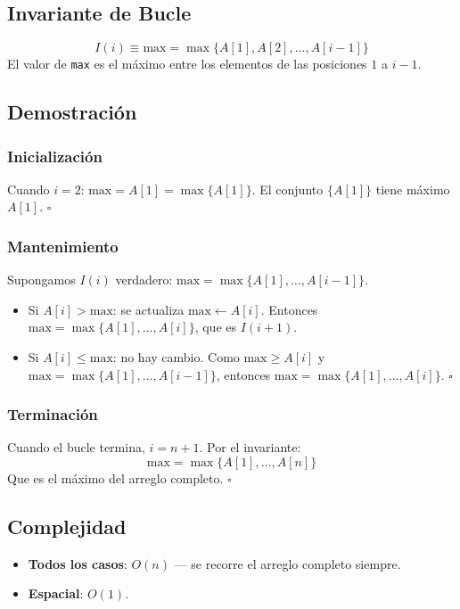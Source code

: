 \documentclass[11pt,a4paper]{article}
\newcommand{\inv}{I}
\begin{document}
\subsection{Invariante de Bucle}
\[
\boxed{\inv(i) \equiv \text{max} = \max\{A[1], A[2], \ldots, A[i-1]\}}
\]
El valor de \texttt{max} es el máximo entre los elementos de las posiciones $1$ a $i-1$.

\subsection{Demostración}

\subsubsection{Inicialización}
Cuando $i = 2$: $\text{max} = A[1] = \max\{A[1]\}$. El conjunto $\{A[1]\}$ tiene máximo $A[1]$. $\square$

\subsubsection{Mantenimiento}
Supongamos $\inv(i)$ verdadero: $\text{max} = \max\{A[1], \ldots, A[i-1]\}$.
\begin{itemize}
    \item Si $A[i] > \text{max}$: se actualiza $\text{max} \gets A[i]$. Entonces $\text{max} = \max\{A[1], \ldots, A[i]\}$, que es $\inv(i+1)$.
    \item Si $A[i] \leq \text{max}$: no hay cambio. Como $\text{max} \geq A[i]$ y $\text{max} = \max\{A[1], \ldots, A[i-1]\}$, entonces $\text{max} = \max\{A[1], \ldots, A[i]\}$. $\square$
\end{itemize}

\subsubsection{Terminación}
Cuando el bucle termina, $i = n+1$. Por el invariante:
\[
\text{max} = \max\{A[1], \ldots, A[n]\}
\]
Que es el máximo del arreglo completo. $\square$

\subsection{Complejidad}
\begin{itemize}
    \item \textbf{Todos los casos}: $O(n)$ --- se recorre el arreglo completo siempre.
    \item \textbf{Espacial}: $O(1)$.
\end{itemize}
\end{document}
